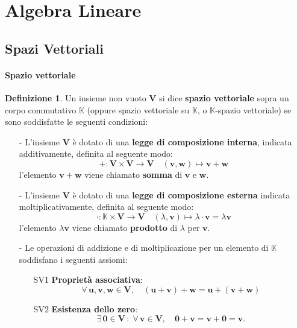 \documentclass{article}
\theoremstyle{plain}
\theoremstyle{definition}
\newtheorem{defn}{Definizione}[section]
\theoremstyle{remark}
\begin{document}
\newpage
\section{Algebra Lineare}
\vspace{20pt}

\vspace{20pt}
\subsection{Spazi Vettoriali}
\vspace{20pt}

\paragraph{Spazio vettoriale}
\begin{bxthm}
\begin{defn}
    Un insieme non vuoto $\mathbf{V}$ si dice \textbf{spazio vettoriale} sopra un corpo commutativo $\mathbb{K}$ (oppure spazio vettoriale su $\mathbb{K}$, o $\mathbb{K}$-spazio vettoriale) se sono soddisfatte le seguenti condizioni:
    \begin{itemize}
        \item[-] L'insieme $\mathbf{V}$ è dotato di una \textbf{legge di composizione interna}, indicata additivamente, definita al seguente modo:
        \[ +:\mathbf{V}\times \mathbf{V}\to \mathbf{V}\quad(\mathbf{v},\mathbf{w})\mapsto \mathbf{v}+\mathbf{w} \]
        l'elemento $\mathbf{v}+\mathbf{w}$ viene chiamato \textbf{somma} di $\mathbf{v}$ e $\mathbf{w}$.
        \item[-] L'insieme $\mathbf{V}$ è dotato di una \textbf{legge di composizione esterna} indicata moltiplicativamente, definita al seguente modo:
        \[ \cdot:\mathbb{K}\times \mathbf{V}\to\mathbf{V}\quad (\lambda,\mathbf{v})\mapsto \lambda\cdot\mathbf{v}=\lambda\mathbf{v} \]
        l'elemento $\lambda\mathbf{v}$ viene chiamato \textbf{prodotto} di $\lambda$ per $\mathbf{v}$.
        \item[-] Le operazioni di addizione e di moltiplicazione per un elemento di $\mathbb{K}$ soddisfano i seguenti assiomi:
        \begin{itemize}
            \item[SV1] \textbf{Proprietà associativa}:
            \[\forall\,\mathbf{u},\mathbf{v},\mathbf{w}\in \mathbf{V},\quad (\mathbf{u} + \mathbf{v}) + \mathbf{w} = \mathbf{u} + (\mathbf{v} + \mathbf{w}) \]
            
            \item[SV2] \textbf{Esistenza dello zero}:
            \[\exists\,\mathbf{0} \in \mathbf{V}\,:\;\forall\,\mathbf{v}\in \mathbf{V},\quad \mathbf{0} + \mathbf{v} = \mathbf{v} + \mathbf{0} = \mathbf{v}. \]
            

\end{itemize}
\end{itemize}
\end{defn}
\end{bxthm}
\end{document}
